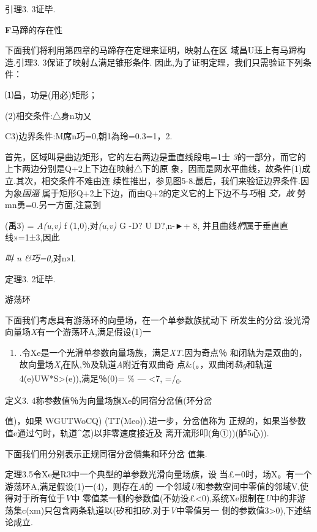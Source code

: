 \documentclass{article}
\begin{document}
引理3. 3证毕.\textbar{}

\textbf{F}马蹄的存在性

下面我们将利用第四章的马蹄存在定理来证明，映射厶在区
域昌U珏上有马蹄构造.引理3. 3保证了映射厶满足锥形条件.
因此,为了证明定理，我们只需验证下列条件：

⑴昌，功是(用必)矩形；

(2)相交条件:△身n功乂

C3)边界条件:M席n巧=0,朝1為玲=0.3=1，2.

首先，区域叫是曲边矩形，它的左右两边是垂直线段电=1士
\emph{3}的一部分，而它的上卞两边分别是Q+2上下边在映射△下的原
象，因而是网水平曲线，故条件(1)成立.其次，相交条件不难由连
续性推出，参见图5-8.最后，我们来验证边界条件.因为象\emph{国淄}
属于矩形Q+2上下边，而由Q+2的定义它的上下边不与\emph{巧}相 \emph{交，故}
勞mn勇=0.另一方面,注意到

(禹3) = \emph{A(u,v)} f (1,0),对\emph{(u,v)} G -D? U D?,n-►+ 8,
并且曲线\emph{椚}属于垂直直线»=1±3,因此

\emph{叫 n \&巧=0,}对n»l.

定理3. 2证毕.\textbar{}

游荡环

下面我们考虑具有游荡环的向量场，在一个单参数族扰动下
所发生的分岔.设光滑向量场\emph{X}有一个游荡环A,满足假设(1)一

\begin{enumerate}
\def\labelenumi{(\arabic{enumi})}
\setcounter{enumi}{3}
\item
  .令Xe是一个光滑单参数向量场族，满足\emph{XT.}因为奇点％
  和闭轨为是双曲的，故向量场\emph{X\textsubscript{t}}在队,％及轨道\emph{A}附近有双曲奇
  点\&(。，双曲闭\emph{轨g}和轨道4(e)UW*S\textgreater{}(e)),满足％(0)=
  \% --- \textless{}7, =/\textsubscript{0}.
\end{enumerate}

定义3. 4称参数值％为向量场旗Xe的同宿分岔值(环分岔

值)，如果 WGUTWoCQ) (TT(Meo)).进一步，分岔值称为
正规的，如果当參数值e通过勺时，轨道\^{}怎)以非零速度接近及
离开流形叩(角①))(胪5心)).

下面我们用分别表示正规同宿分岔價集和环分岔 值集.

定理3.5令Xe是R3中一个典型的单参数光滑向量场族，设
当£=0时，场X。有一个游荡环A,满足假设(1)一(4)，则存在\emph{A}的
一个邻域\emph{U}和参数空间中零值的邻域V,使得对于所有位于\emph{V}中
零值某一侧的参数值(不妨设£\textless{}0),系统Xe限制在\emph{U}中的非游
荡集c(xm)只包含两条轨道以(矽和扣矽.对于\emph{V}中零值另一
側的参数值3\textgreater{}0),下述结论成立.
\end{document}
